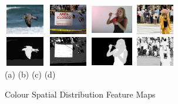 \documentclass[10pt,twocolumn,letterpaper]{article}
\newcommand{\hs}{\hspace{0.58in}}
\begin{document}
\begin{figure}[t]
    \begin{center}
    \includegraphics[width=0.72in,height=0.52in]{./CSD_image/1.jpg}
    \includegraphics[width=0.72in,height=0.52in]{./CSD_image/2.jpg}
    \includegraphics[width=0.72in,height=0.52in]{./CSD_image/3.jpg}
    \includegraphics[width=0.72in,height=0.52in]{./CSD_image/4.jpg}\\
    \includegraphics[width=0.72in,height=0.52in]{./CSD_image/1_CSD.jpg}
    \includegraphics[width=0.72in,height=0.52in]{./CSD_image/2_CSD.jpg}
    \includegraphics[width=0.72in,height=0.52in]{./CSD_image/3_CSD.jpg} 
    \includegraphics[width=0.72in,height=0.52in]{./CSD_image/4_CSD.jpg} \\
    \footnotesize \hspace{0.1cm} (a) \hs (b) \hs  (c) \hs (d) \\
     \caption{Colour Spatial Distribution Feature Maps} \label{Fig:GlobalFeatureMap}
    \end{center}
\end{figure}
\end{document}
